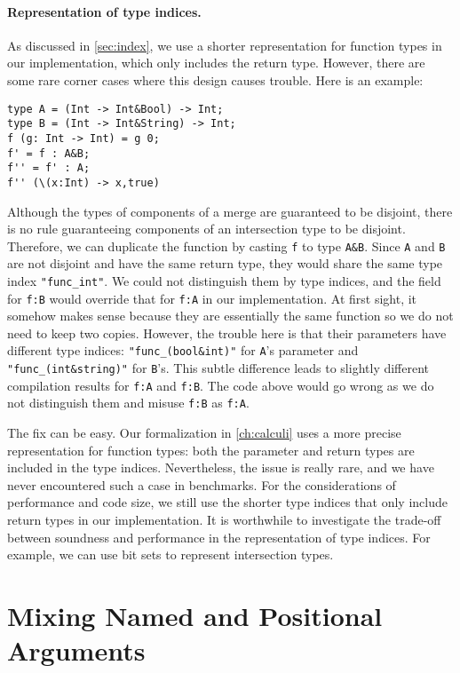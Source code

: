 \paragraph{Representation of type indices.}
As discussed in \autoref{sec:index}, we use a shorter representation for
function types in our implementation, which only includes the return type.
However, there are some rare corner cases where this design causes trouble. Here
is an example:
\begin{lstlisting}
type A = (Int -> Int&Bool) -> Int;
type B = (Int -> Int&String) -> Int;
f (g: Int -> Int) = g 0;
f' = f : A&B;
f'' = f' : A;
f'' (\(x:Int) -> x,true)
\end{lstlisting}
Although the types of components of a merge are guaranteed to be disjoint, there
is no rule guaranteeing components of an intersection type to be disjoint.
Therefore, we can duplicate the function by casting \lstinline{f} to type
\lstinline{A&B}. Since \lstinline{A} and \lstinline{B} are not disjoint and have
the same return type, they would share the same type index
\lstinline{"func_int"}. We could not distinguish them by type indices, and the
field for \lstinline{f:B} would override that for \lstinline{f:A} in our
implementation. At first sight, it somehow makes sense because they are
essentially the same function so we do not need to keep two copies. However, the
trouble here is that their parameters have different type indices:
\lstinline{"func_(bool&int)"} for \lstinline{A}'s parameter and
\lstinline{"func_(int&string)"} for \lstinline{B}'s. This subtle difference
leads to slightly different compilation results for \lstinline{f:A} and
\lstinline{f:B}. The code above would go wrong as we do not distinguish them and
misuse \lstinline{f:B} as \lstinline{f:A}.

The fix can be easy. Our formalization in \autoref{ch:calculi} uses a more
precise representation for function types: both the parameter and return types
are included in the type indices. Nevertheless, the issue is really rare, and we
have never encountered such a case in benchmarks. For the considerations of
performance and code size, we still use the shorter type indices that only
include return types in our implementation. It is worthwhile to investigate the
trade-off between soundness and performance in the representation of type
indices. For example, we can use bit sets to represent intersection types.

\section{Mixing Named and Positional Arguments}

